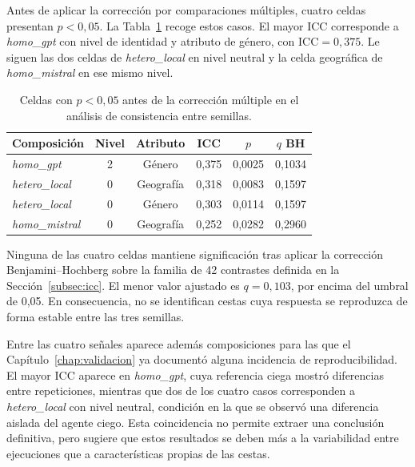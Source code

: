 Antes de aplicar la corrección por comparaciones múltiples, cuatro celdas presentan $p<0{,}05$. La Tabla~\ref{tab:icc_nominal} recoge estos casos. El mayor ICC corresponde a \textit{homo\_gpt} con nivel de identidad y atributo de género, con $\mathrm{ICC}=0{,}375$. Le siguen las dos celdas de \textit{hetero\_local} en nivel neutral y la celda geográfica de \textit{homo\_mistral} en ese mismo nivel.

\begin{table}[htbp]
	\centering
	\caption{Celdas con $p<0{,}05$ antes de la corrección múltiple en el
		análisis de consistencia entre semillas.}
	\label{tab:icc_nominal}
	\small
	\begin{tabular}{p{3.2cm} c c c c c}
		\hline
		\textbf{Composición} &
		\textbf{Nivel} &
		\textbf{Atributo} &
		\textbf{ICC} &
		\textbf{$p$} &
		\textbf{$q$ BH} \\
		\hline
		
		\textit{homo\_gpt}
		& 2 & Género
		& 0,375 & 0,0025 & 0,1034 \\
		
		\textit{hetero\_local}
		& 0 & Geografía
		& 0,318 & 0,0083 & 0,1597 \\
		
		\textit{hetero\_local}
		& 0 & Género
		& 0,303 & 0,0114 & 0,1597 \\
		
		\textit{homo\_mistral}
		& 0 & Geografía
		& 0,252 & 0,0282 & 0,2960 \\
		
		\hline
	\end{tabular}
\end{table}

Ninguna de las cuatro celdas mantiene significación tras aplicar la corrección Benjamini--Hochberg sobre la familia de 42 contrastes definida en la Sección~\ref{subsec:icc}. El menor valor ajustado es $q=0{,}103$, por encima del umbral de 0,05. En consecuencia, no se identifican cestas cuya respuesta se reproduzca de forma estable entre las tres semillas.

Entre las cuatro señales aparece además composiciones para las que el Capítulo~\ref{chap:validacion} ya documentó alguna incidencia de reproducibilidad. El mayor ICC aparece en \textit{homo\_gpt}, cuya referencia ciega mostró diferencias entre repeticiones, mientras que dos de los cuatro casos corresponden a \textit{hetero\_local} con nivel neutral, condición en la que se observó una diferencia aislada del agente ciego. Esta coincidencia no permite extraer una conclusión definitiva, pero sugiere que estos resultados se deben más a la variabilidad entre ejecuciones que a características propias de las cestas.

